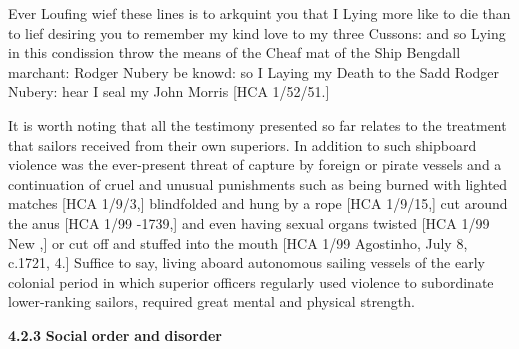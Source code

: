 Ever Loufing wief these lines is to arkquint you that I Lying more like to die than to lief desiring you to remember my kind love to my three Cussons: and so Lying in this condission throw the means of the Cheaf mat of the Ship Bengdall marchant: Rodger Nubery be knowd: so I Laying my Death to the Sadd Rodger Nubery: hear I seal my John Morris [HCA 1/52/51.] 

It is worth noting that all the testimony presented so far relates to the treatment that sailors received from their own superiors. In addition to such shipboard violence was the ever-present threat of capture by foreign or pirate vessels and a continuation of cruel and unusual punishments such as being burned with lighted matches [HCA 1/9/3,] blindfolded and hung by a rope [HCA 1/9/15,] cut around the anus [HCA 1/99 \citealt{Jamaica1738}-1739,] and even having sexual organs twisted [HCA 1/99 New \citealt{Providence1722},] or cut off and stuffed into the mouth [HCA 1/99 Agostinho, July 8, c.1721, 4.] Suffice to say, living aboard autonomous sailing vessels of the early colonial period in which superior officers regularly used violence to subordinate lower-ranking sailors, required great mental and physical strength.

\textbf{4.2.3} \textbf{Social} \textbf{order} \textbf{and} \textbf{disorder}

